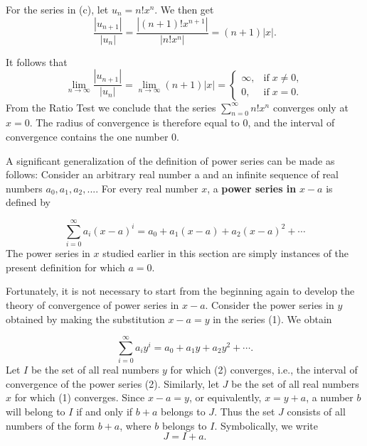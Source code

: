 \begin{example}
For the series in (c), let $u_n = n! x^n$. We then get
$$
\frac{|u_{n+1}|}{|u_n|} =  \frac{|(n + 1)! x^{n + 1}|} {| n! x^n |} = (n + 1) |x| .
$$

\noindent It follows that
$$
\lim_{n \rightarrow \infty} \frac{|u_{n+1}|}{|u_n|} = \lim_{n \rightarrow \infty} (n + 1) |x| = \left \{ \begin{array}{ll}
\infty,  & \mbox{if}\; x \neq 0,\\
0,        & \mbox{if}\; x = 0.
\end{array}
\right .
$$
\noindent From the Ratio Test we conclude that the series $\sum_{n=0}^\infty n! x^n$ converges only at $x = 0$. The radius of convergence is therefore equal to 0, and the interval of convergence contains the one number 0.
\end{example}

A significant generalization of the definition of power series can be made as follows: Consider an arbitrary real number a and an infinite sequence of
real numbers $a_0, a_1, a_2, ...$. For every real number $x$, a \textbf{power series in} $x-a$ is defined by

\begin{equation}
\sum_{i=0}^\infty a_i(x - a)^i = a_0 + a_1(x - a) + a_2(x - a)^2 + \cdots
\label{eq9.6.1}
\end{equation}
\noindent The power series in $x$ studied earlier in this section are simply instances of the present definition for which $a = 0$.

Fortunately, it is not necessary to start from the beginning again to develop the theory of convergence of power series in $x - a$. Consider the power series in $y$ obtained by making the substitution $x - a = y$ in the series (1). We obtain

\begin{equation}
\sum_{i=0}^\infty a_{i} y^i = a_0 + a_{1} y + a_{2} y^2 + \cdots . 
\label{eq9.6.2}
\end{equation}
\noindent Let $I$ be the set of all real numbers $y$ for which (2) converges, i.e., the interval of convergence of the power series (2). Similarly, let $J$ be the set of all real numbers $x$ for which (1) converges. Since $x - a = y$, or equivalently, $x = y + a$, a number $b$ will belong to $I$ if and only if $b + a$ belongs to $J$. Thus the set $J$ consists of all numbers of the form $b + a$, where $b$ belongs to $I$. Symbolically, we write
$$
J = I + a.
$$
 

